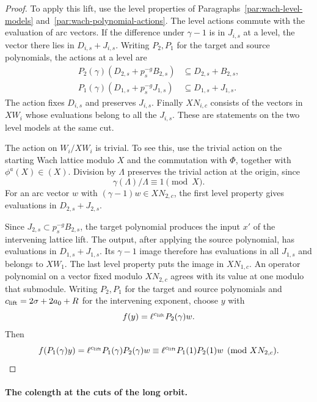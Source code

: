 \begin{proof}
To apply this lift, use the level properties of
Paragraphs~\ref{par:wach-level-models} and~\ref{par:wach-polynomial-actions}. The level actions commute with the
evaluation of arc vectors. If the difference under \(\gamma-1\)
is in \(J_{i,s}\) at a level, the vector there lies in
\(D_{i,s}+J_{i,s}\). Writing \(P_2,P_1\) for the target and source polynomials, the actions at a level are
\[
 \begin{aligned}P_2(\gamma)(D_{2,s}+p_s^{-g}B_{2,s})&\subseteq D_{2,s}+B_{2,s},\\ P_1(\gamma)(D_{1,s}+p_s^{-g}J_{1,s})&\subseteq D_{1,s}+J_{1,s}.\end{aligned}
\]
The action fixes \(D_{i,s}\) and preserves
\(J_{i,s}\). Finally \(XN_{i,c}\) consists of the vectors in
\(XW_i\) whose evaluations belong to all the \(J_{i,s}\).
These are statements on the two level models at the same cut.

The action on \(W_i/XW_i\) is trivial. To see this, use the
trivial action on the starting Wach lattice modulo \(X\) and
the commutation with \(\Phi\), together with
\(\phi^a(X)\in(X)\). Division by \(\Lambda\) preserves the trivial action at the origin, since
\[
 \gamma(\Lambda)/\Lambda\equiv1\pmod X.
\]
For an arc vector \(w\) with
\((\gamma-1)w\in XN_{2,c}\), the first level property gives
evaluations in \(D_{2,s}+J_{2,s}\).

Since
\(J_{2,s}\subset p_s^{-g}B_{2,s}\), the target polynomial
produces the input \(x'\) of the intervening lattice lift.
The output, after applying the source polynomial, has
evaluations in \(D_{1,s}+J_{1,s}\). Its \(\gamma-1\) image
therefore has evaluations in all \(J_{1,s}\) and belongs to
\(XW_1\). The last level property puts the image in
\(XN_{1,c}\). An operator polynomial on a vector fixed
modulo \(XN_{2,c}\) agrees with its value at one modulo that
submodule. Writing \(P_2,P_1\) for the target and source
polynomials and \(c_{\rm lift}=2\sigma+2a_0+R\) for the intervening exponent,
choose \(y\) with
\[
 f(y)=\ell^{c_{\rm lift}} P_2(\gamma)w.
\]
Then
\[
 f(P_1(\gamma)y)
 =\ell^{c_{\rm lift}} P_1(\gamma)P_2(\gamma)w
 \equiv\ell^{c_{\rm lift}} P_1(1)P_2(1)w\pmod{XN_{2,c}} .
\]

\end{proof}
\paragraph{The colength at the cuts of the long orbit.}\label{par:wach-cut-colength}

